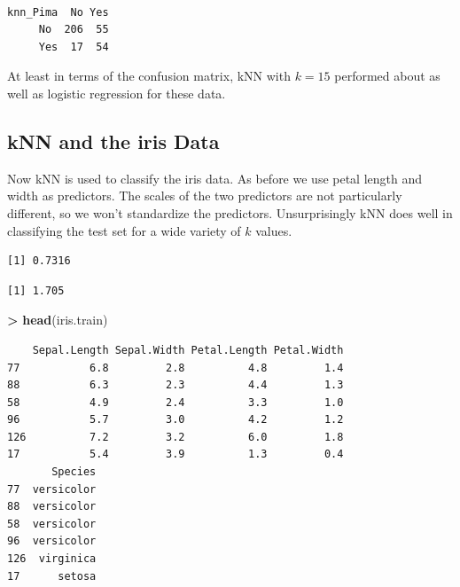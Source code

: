 \documentclass[]{krantz}
\makeatletter
\newenvironment{Shaded}{\begin{snugshade}}{\end{snugshade}}
\newcommand{\KeywordTok}[1]{\textcolor[rgb]{0.27,0.27,0.27}{\textbf{#1}}}
\newcommand{\NormalTok}[1]{#1}
\newcommand{\OperatorTok}[1]{\textcolor[rgb]{0.43,0.43,0.43}{\textbf{#1}}}
\newcommand{\StringTok}[1]{\textcolor[rgb]{0.5,0.5,0.5}{#1}}
\newenvironment{kframe}{%
\medskip{}
\setlength{\fboxsep}{.8em}
 \def\at@end@of@kframe{}%
 \ifinner\ifhmode%
  \def\at@end@of@kframe{\end{minipage}}%
  \begin{minipage}{\columnwidth}%
 \fi\fi%
 \def\FrameCommand##1{\hskip\@totalleftmargin \hskip-\fboxsep
 \colorbox{shadecolor}{##1}\hskip-\fboxsep
     \hskip-\linewidth \hskip-\@totalleftmargin \hskip\columnwidth}%
 \MakeFramed {\advance\hsize-\width
   \@totalleftmargin\z@ \linewidth\hsize
   \@setminipage}}%
 {\par\unskip\endMakeFramed%
 \at@end@of@kframe}
\renewenvironment{Shaded}{\begin{kframe}}{\end{kframe}}
\makeatother
\begin{document}
\begin{verbatim}
        
knn_Pima  No Yes
     No  206  55
     Yes  17  54
\end{verbatim}

At least in terms of the confusion matrix, kNN with \(k=15\) performed about as well as logistic regression for these data.

\hypertarget{knn-and-the-iris-data}{%
\subsection{kNN and the iris Data}\label{knn-and-the-iris-data}}

Now kNN is used to classify the iris data. As before we use petal length and width as predictors. The scales of the two predictors are not particularly different, so we won't standardize the predictors. Unsurprisingly kNN does well in classifying the test set for a wide variety of \(k\) values.

\begin{Shaded}
\end{Shaded}

\begin{verbatim}
[1] 0.7316
\end{verbatim}

\begin{Shaded}
\end{Shaded}

\begin{verbatim}
[1] 1.705
\end{verbatim}

\begin{Shaded}
\begin{Highlighting}[]
\OperatorTok{>}\StringTok{ }\KeywordTok{head}\NormalTok{(iris.train)}
\end{Highlighting}
\end{Shaded}

\begin{verbatim}
    Sepal.Length Sepal.Width Petal.Length Petal.Width
77           6.8         2.8          4.8         1.4
88           6.3         2.3          4.4         1.3
58           4.9         2.4          3.3         1.0
96           5.7         3.0          4.2         1.2
126          7.2         3.2          6.0         1.8
17           5.4         3.9          1.3         0.4
       Species
77  versicolor
88  versicolor
58  versicolor
96  versicolor
126  virginica
17      setosa
\end{verbatim}
\end{document}
